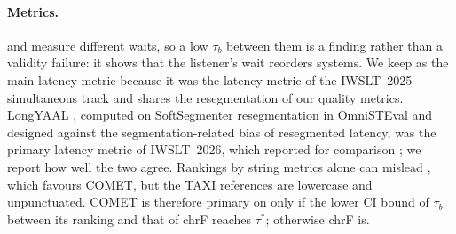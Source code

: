 \paragraph{Metrics.}
\laal and \eo measure different waits, so a low $\tau_b$ between them is a finding rather than a validity failure: it shows that the listener's wait reorders systems. We keep \laal as the main latency metric because it was the latency metric of the IWSLT~2025 simultaneous track \citep{abdulmumin2025findings} and shares the resegmentation of our quality metrics. LongYAAL \citep{polak2025better}, computed on SoftSegmenter resegmentation in OmniSTEval and designed against the segmentation-related bias of resegmented latency, was the primary latency metric of IWSLT~2026, which reported \laal for comparison \citep{adelani2026speech}; we report how well the two agree. Rankings by string metrics alone can mislead \citep{kocmi2021ship}, which favours COMET, but the TAXI references are lowercase and unpunctuated. COMET is therefore primary on \taxi only if the lower CI bound of $\tau_b$ between its ranking and that of chrF reaches $\tau^\ast$; otherwise chrF is.
